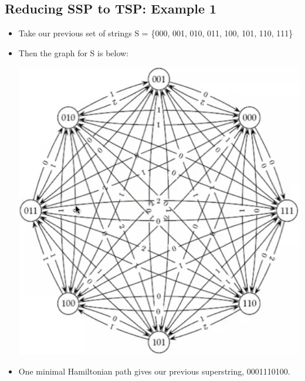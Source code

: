 \documentclass[10pt]{article}
\begin{document}
\subsection*{Reducing SSP to TSP: Example 1}
\begin{itemize}
    \item Take our previous set of strings S = \{000, 001, 010, 011, 100, 101, 110, 111\}
    \item Then the graph for S is below:
    \begin{center}
        \includegraphics*[scale=0.8]{W4_6.png}
    \end{center}
    \item One minimal Hamiltonian path gives our previous superstring, 0001110100.    
\end{itemize}
\end{document}
